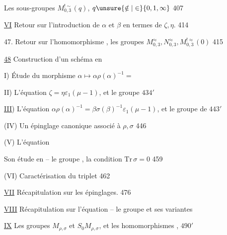 Les sous-groupes \(M_{0,3}^{!\sim}(q)\), \(q\unsure{\notin|\in}\{0,1,\infty\}\) \hfill 407

\uline{VI} Retour sur l'introduction de \(\alpha\) et \(\beta\) en termes de \(\zeta,\eta\). \hfill 414

47. Retour sur l'homomorphisme
,
les groupes \(M_{0,3}^{\approx},N_{0,3}^{\approx},M_{0,3}^{!\approx}(0)\)
\hfill {} 415

\uline{48} Construction d'un schéma en  \hfill {}

I) Étude du morphisme \(\alpha\mapsto\alpha\rho(\alpha)^{-1}=\)\unsure{\([\alpha,\rho]\)} \hfill {}

II) L'équation \(\zeta=\eta\varepsilon_1(\mu-1)\), et le groupe
 \hfill \(434'\)

\uline{III}) L'équation \(\alpha\rho(\alpha)^{-1}=\beta\sigma(\beta)^{-1}\varepsilon_1(\mu-1)\),
et le groupe  de  \hfill \(443'\)

(IV) Un épinglage canonique associé à \(\rho,\sigma\) \hfill 446

(V) L'équation 
\hfill {}

\unsure{\(\{\)|\(\varepsilon\)} Son étude en
 --
le groupe , la condition \(\mathrm{Tr}\,\sigma=0\) \hfill 459

(VI) Caractérisation  du triplet  \hfill 462

\uline{VII} Récapitulation sur les épinglages. \hfill 476

\uline{VIII} Récapitulation sur l'équation -- le groupe
 et ses variantes \hfill {}

\uline{IX} Les groupes \(M_{\rho,\sigma}\) et \(S_0M_{\rho,\sigma}\), et les homomorphismes
,
 \hfill \(490'\)

